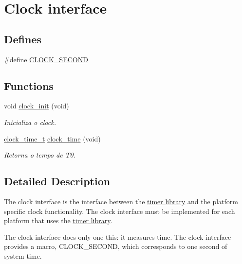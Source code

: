 \hypertarget{group__clock}{
\section{Clock interface}
\label{group__clock}
}
\subsection*{Defines}
\begin{DoxyCompactItemize}
\item 
\#define \hyperlink{group__clock_gae3ced0551b26c9b99cb45a86f34d100a}{CLOCK\_\-SECOND}
\end{DoxyCompactItemize}
\subsection*{Functions}
\begin{DoxyCompactItemize}
\item 
void \hyperlink{group__clock_ga78ab77b57cf2e00089f0a3a22508524c}{clock\_\-init} (void)
\begin{DoxyCompactList}\small\item\em Inicializa o clock. \item\end{DoxyCompactList}\item 
\hyperlink{clock-arch_8h_a42fc7b708ad04499c436158fd5f37ed4}{clock\_\-time\_\-t} \hyperlink{group__clock_gae5b7160f2e653725ba5e2024c3cb7bff}{clock\_\-time} (void)
\begin{DoxyCompactList}\small\item\em Retorna o tempo de T0. \item\end{DoxyCompactList}\end{DoxyCompactItemize}


\subsection{Detailed Description}
The clock interface is the interface between the \hyperlink{group__timer}{timer library} and the platform specific clock functionality. The clock interface must be implemented for each platform that uses the \hyperlink{group__timer}{timer library}.

The clock interface does only one this: it measures time. The clock interface provides a macro, CLOCK\_\-SECOND, which corresponds to one second of system time.

